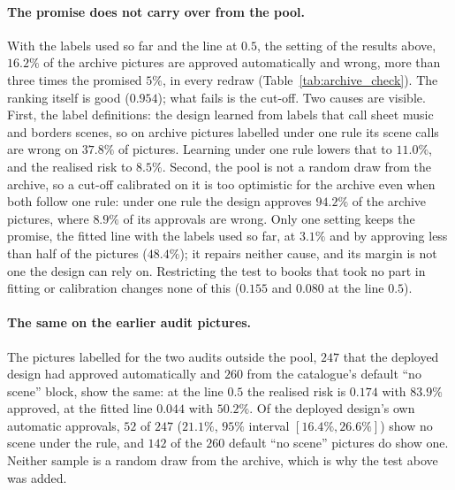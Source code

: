 \paragraph{The promise does not carry over from the pool.} With the labels used so far and the line at $0.5$, the setting of the results above, $16.2\%$ of the archive pictures are approved automatically and wrong, more than three times the promised $5\%$, in every redraw (Table~\ref{tab:archive_check}). The ranking itself is good ($0.954$); what fails is the cut-off. Two causes are visible. First, the label definitions: the design learned from labels that call sheet music and borders scenes, so on archive pictures labelled under one rule its scene calls are wrong on $37.8\%$ of pictures. Learning under one rule lowers that to $11.0\%$, and the realised risk to $8.5\%$. Second, the pool is not a random draw from the archive, so a cut-off calibrated on it is too optimistic for the archive even when both follow one rule: under one rule the design approves $94.2\%$ of the archive pictures, where $8.9\%$ of its approvals are wrong. Only one setting keeps the promise, the fitted line with the labels used so far, at $3.1\%$ and by approving less than half of the pictures ($48.4\%$); it repairs neither cause, and its margin is not one the design can rely on. Restricting the test to books that took no part in fitting or calibration changes none of this ($0.155$ and $0.080$ at the line $0.5$).

\paragraph{The same on the earlier audit pictures.} The pictures labelled for the two audits outside the pool, $247$ that the deployed design had approved automatically and $260$ from the catalogue's default ``no scene'' block, show the same: at the line $0.5$ the realised risk is $0.174$ with $83.9\%$ approved, at the fitted line $0.044$ with $50.2\%$. Of the deployed design's own automatic approvals, $52$ of $247$ ($21.1\%$, $95\%$ interval $[16.4\%, 26.6\%]$) show no scene under the rule, and $142$ of the $260$ default ``no scene'' pictures do show one. Neither sample is a random draw from the archive, which is why the test above was added.

